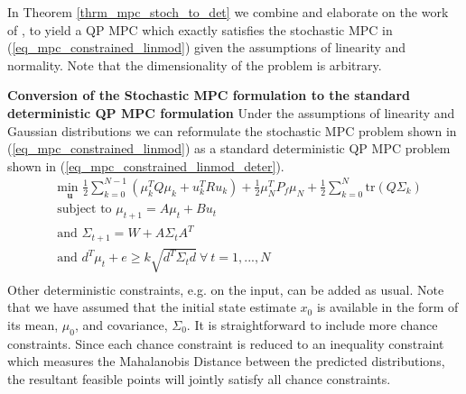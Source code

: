 In Theorem \ref{thrm_mpc_stoch_to_det} we combine and elaborate on the work of \cite{yan1}, \cite{vanhessem1} to yield a QP MPC which exactly satisfies the stochastic MPC in (\ref{eq_mpc_constrained_linmod}) given the assumptions of linearity and normality. Note that the dimensionality of the problem is arbitrary.
\begin{thrm}
\textbf{Conversion of the Stochastic MPC formulation to the standard deterministic QP MPC formulation} Under the assumptions of linearity and Gaussian distributions we can reformulate the stochastic MPC problem shown in (\ref{eq_mpc_constrained_linmod}) as a standard deterministic QP MPC problem shown in (\ref{eq_mpc_constrained_linmod_deter}).
\begin{equation}
\begin{aligned}
&\underset{\mathbf{u}}{\text{min }} \frac{1}{2}\sum_{k=0}^{N-1} \left( \mu_k^TQ\mu_k + u_k^TRu_k \right) + \frac{1}{2}\mu_N^TP_f\mu_N + \frac{1}{2}\sum_{k=0}^N \text{tr}(Q\Sigma_k) \\
& \text{subject to } \mu_{t+1}=A\mu_t + Bu_t \\
& \text{and } \Sigma_{t+1} = W+A\Sigma_t A^T \\
& \text{and } d^T\mu_t + e \geq k\sqrt{d^T \Sigma_t d} ~\forall ~t=1,...,N\\
\end{aligned}
\label{eq_mpc_constrained_linmod_deter}
\end{equation}
\label{thrm_mpc_stoch_to_det}
Other deterministic constraints, e.g. on the input, can be added as usual. Note that we have assumed that the initial state estimate $x_0$ is available in the form of its mean, $\mu_0$,  and covariance, $\Sigma_0$. It is straightforward to include more chance constraints. Since each chance constraint is reduced to an inequality constraint which measures the Mahalanobis Distance between the predicted distributions, the resultant feasible points will jointly satisfy all chance constraints.  
\end{thrm}
